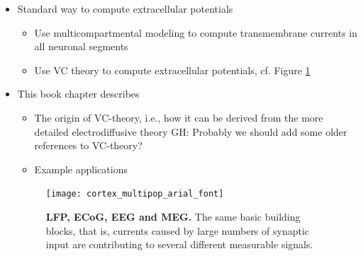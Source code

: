 \documentclass[preprint,11pt,authoryear]{elsarticle}
\begin{document}
\begin{itemize}
\begin{itemize}
\item Standard way to compute extracellular potentials
\begin{itemize} 
\item Use multicompartmental modeling to compute transmembrane currents  in all neuronal segments
\item Use VC theory to compute extracellular potentials, cf. Figure \ref{fig:multimodal}
\end{itemize}
%
\item This book chapter describes
\begin{itemize}
\item The origin of VC-theory, i.e., how it can be derived from the more detailed electrodiffusive theory 
GH: Probably we should add some older references to VC-theory?
\item Example applications
\end{itemize}


\begin{figure}[!ht]
\begin{center}
\texttt{[image: cortex\_multipop\_arial\_font]}
\end{center}
\caption{\textbf{LFP, ECoG, EEG and MEG.} The same basic building blocks, that is, currents caused by large numbers of synaptic input are contributing to several different measurable signals.}
\label{fig:multimodal}
\end{figure}






\end{itemize}
\end{itemize}
\end{document}
